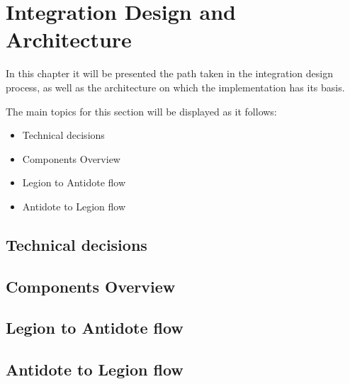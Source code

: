 \chapter{Integration Design and Architecture}
\label{cha:integration_design_and_architecture}

In this chapter it will be presented the path taken in the integration design process, as well as the architecture on which the implementation has its basis.\par
	The main topics for this section will be displayed as it follows:
\begin{itemize}
\item Technical decisions

\item Components Overview

\item Legion to Antidote flow

\item Antidote to Legion flow
\end{itemize}

\section{Technical decisions}
\label{sec:technical_decisions}

\section{Components Overview}
\label{sec:components_overview}

\section{Legion to Antidote flow}
\label{sec:legion_to_antidote_flow}

\section{Antidote to Legion flow}
\label{sec:antidote to legion flow}